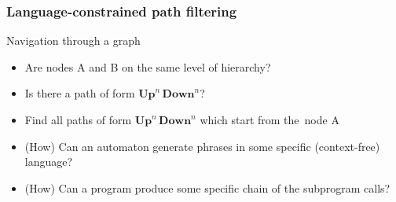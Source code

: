 \documentclass[xcolor=table]{beamer}
\begin{document}
\begin{frame}[fragile]
  \transwipe[direction=90]
  \frametitle{Language-constrained path filtering}
  \begin{minipage}[m]{0.45\linewidth}
\end{minipage}\hfill
\begin{minipage}[m]{0.5\linewidth}
Navigation through a graph
\begin{itemize}
      \item Are nodes A and B on the same level of hierarchy?
      \item Is there a path of form $\textbf{Up}^n \, \textbf{Down}^n$?
      \item Find all paths of form $\textbf{Up}^n \, \textbf{Down}^n$ which start from the~node A
\end{itemize}

\end{minipage}

  \begin{itemize}
    \item (How) Can an automaton generate phrases in some specific (context-free) language?
    \item (How) Can a program produce some specific chain of the subprogram calls? 
  \end{itemize}
\end{frame}
\end{document}
